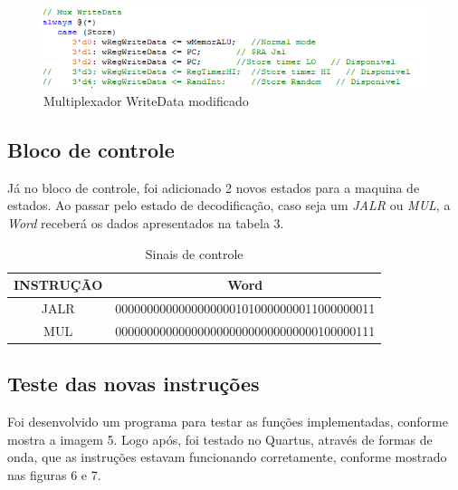 \documentclass[12pt]{article}
\begin{document}
\begin{figure}[H]
	\flushleft
	\includegraphics[width=1\textwidth]{MUXWD.png}
	\caption{Multiplexador WriteData modificado}
	\label{fig:pest}
\end{figure}

\subsection{Bloco de controle}
\label{subsec:control}

Já no bloco de controle, foi adicionado 2 novos estados para a maquina de estados. Ao passar pelo estado de decodificação, caso seja um \textit{JALR} ou \textit{MUL}, a \textit{Word} receberá os dados apresentados na tabela 3.

\begin{table}[H]
	\centering
	\begin{tabular}{|c|c|}
		\hline
		INSTRUÇÃO & Word \\\hline
		JALR & 00000000000000000001010000000011000000011 \\\hline
	    MUL  & 00000000000000000000000000000000100000111 \\\hline
	\end{tabular}
	\caption{Sinais de controle}
	\label{tab:mul}
\end{table}

\subsection{Teste das novas instruções}
\label{subsec:testeisa}

Foi desenvolvido um programa para testar as funções implementadas, conforme mostra a imagem 5. Logo após, foi testado no Quartus, através de formas de onda, que as instruções estavam funcionando corretamente, conforme mostrado nas figuras 6 e 7.   
\end{document}
